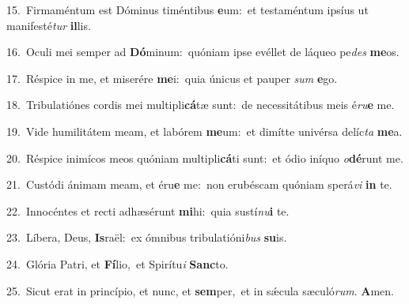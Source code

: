 {\numbfont\textcolor{\numbcolor}{15.}}~Firmaméntum est Dóminus timéntibus \textbf{e}\-um:~\star et testaméntum ipsíus ut manifesté\textit{tur} \textbf{il}\-lis.\par
{\numbfont\textcolor{\numbcolor}{16.}}~Oculi mei semper ad \textbf{Dó}\-minum:~\star quóniam ipse evéllet de láqueo pe\textit{des} \textbf{me}\-os.\par
{\numbfont\textcolor{\numbcolor}{17.}}~Réspice in me, et miserére \textbf{me}\-i:~\star quia únicus et pauper \textit{sum} \textbf{e}\-go.\par
{\numbfont\textcolor{\numbcolor}{18.}}~Tribulatiónes cordis mei multipli\-\textbf{cá}\-tæ sunt:~\star de necessitátibus meis é\-\textit{ru}\-\textbf{e} me.\par
{\numbfont\textcolor{\numbcolor}{19.}}~Vide humilitátem meam, et labórem \textbf{me}\-um:~\star et dimítte univérsa delíc\textit{ta} \textbf{me}\-a.\par
{\numbfont\textcolor{\numbcolor}{20.}}~Réspice inimícos meos quóniam multipli\-\textbf{cá}\-ti sunt:~\star et ódio iníquo \textit{o}\-\textbf{dé}runt me.\par
{\numbfont\textcolor{\numbcolor}{21.}}~Custódi ánimam meam, et éru\textbf{e} me:~\star non erubéscam quóniam sperá\textit{vi} \textbf{in} te.\par
{\numbfont\textcolor{\numbcolor}{22.}}~Innocéntes et recti adhæsérunt \textbf{mi}\-hi:~\star quia sustí\-\textit{nu}\-\textbf{i} te.\par
{\numbfont\textcolor{\numbcolor}{23.}}~Líbera, Deus, \textbf{Is}\-raël:~\star ex ómnibus tribulatióni\textit{bus} \textbf{su}\-is.\par
{\numbfont\textcolor{\numbcolor}{24.}}~Glória Patri, et \textbf{Fí}\-lio,~\star et Spirítu\textit{i} \textbf{Sanc}\-to.\par
{\numbfont\textcolor{\numbcolor}{25.}}~Sicut erat in princípio, et nunc, et \textbf{sem}\-per,~\star et in sǽcula sæculó\-\textit{rum}\-. \textbf{A}\-men.\par

